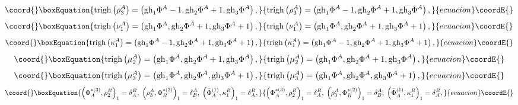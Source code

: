 \documentclass[a4paper,12pt]{article}
\begin{document}
\begin{equation}\coord{}\boxEquation{
\mathrm{trigh}\left( \rho _{3}^{A}\right) =\left( \mathrm{gh}_{1}\Phi ^{A}-1,
\mathrm{gh}_{2}\Phi ^{A}+1,\mathrm{gh}_{3}\Phi ^{A}\right) ,  \label{sp3.103}
}{
\mathrm{trigh}\left( \rho _{3}^{A}\right) =\left( \mathrm{gh}_{1}\Phi ^{A}-1,
\mathrm{gh}_{2}\Phi ^{A}+1,\mathrm{gh}_{3}\Phi ^{A}\right) ,  }{ecuacion}\coordE{}\end{equation}
\begin{equation}\coord{}\boxEquation{
\mathrm{trigh}\left( \nu _{1}^{A}\right) =\left( \mathrm{gh}_{1}\Phi ^{A},
\mathrm{gh}_{2}\Phi ^{A}+1,\mathrm{gh}_{3}\Phi ^{A}+1\right) ,
\label{sp3.104}
}{
\mathrm{trigh}\left( \nu _{1}^{A}\right) =\left( \mathrm{gh}_{1}\Phi ^{A},
\mathrm{gh}_{2}\Phi ^{A}+1,\mathrm{gh}_{3}\Phi ^{A}+1\right) ,
}{ecuacion}\coordE{}\end{equation}
\begin{equation}\coord{}\boxEquation{
\mathrm{trigh}\left( \kappa _{1}^{A}\right) =\left( \mathrm{gh}_{1}\Phi
^{A}-1,\mathrm{gh}_{2}\Phi ^{A}+1,\mathrm{gh}_{3}\Phi ^{A}+1\right) ,
\label{sp3.105}
}{
\mathrm{trigh}\left( \kappa _{1}^{A}\right) =\left( \mathrm{gh}_{1}\Phi
^{A}-1,\mathrm{gh}_{2}\Phi ^{A}+1,\mathrm{gh}_{3}\Phi ^{A}+1\right) ,
}{ecuacion}\coordE{}\end{equation}
\begin{equation}\coord{}\boxEquation{
\mathrm{trigh}\left( \mu _{2}^{A}\right) =\left( \mathrm{gh}_{1}\Phi ^{A},
\mathrm{gh}_{2}\Phi ^{A}+1,\mathrm{gh}_{3}\Phi ^{A}\right) ,  \label{sp3.106}
}{
\mathrm{trigh}\left( \mu _{2}^{A}\right) =\left( \mathrm{gh}_{1}\Phi ^{A},
\mathrm{gh}_{2}\Phi ^{A}+1,\mathrm{gh}_{3}\Phi ^{A}\right) ,  }{ecuacion}\coordE{}\end{equation}
\begin{equation}\coord{}\boxEquation{
\mathrm{trigh}\left( \mu _{3}^{A}\right) =\left( \mathrm{gh}_{1}\Phi ^{A},
\mathrm{gh}_{2}\Phi ^{A},\mathrm{gh}_{3}\Phi ^{A}+1\right) ,  \label{sp3.107}
}{
\mathrm{trigh}\left( \mu _{3}^{A}\right) =\left( \mathrm{gh}_{1}\Phi ^{A},
\mathrm{gh}_{2}\Phi ^{A},\mathrm{gh}_{3}\Phi ^{A}+1\right) ,  }{ecuacion}\coordE{}\end{equation}
\begin{equation}\coord{}\boxEquation{
\left( \Phi _{A}^{*(3)},\rho _{2}^{B}\right) _{1}=\delta _{A}^{B},\;\left(
\rho _{3}^{A},\Phi _{B}^{*(2)}\right) _{1}=\delta _{B}^{A},\;\left( \bar{\Phi
}_{A}^{(1)},\kappa _{1}^{B}\right) _{1}=\delta _{A}^{B},  \label{sp3.108}
}{
\left( \Phi _{A}^{*(3)},\rho _{2}^{B}\right) _{1}=\delta _{A}^{B},\;\left(
\rho _{3}^{A},\Phi _{B}^{*(2)}\right) _{1}=\delta _{B}^{A},\;\left( \bar{\Phi
}_{A}^{(1)},\kappa _{1}^{B}\right) _{1}=\delta _{A}^{B},  }{ecuacion}\coordE{}\end{equation}
\end{document}
